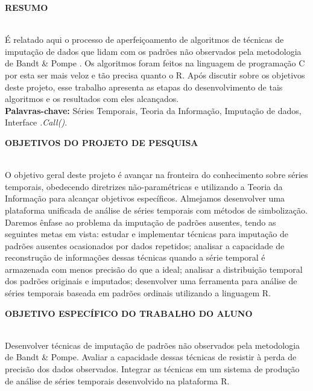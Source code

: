 \documentclass{article}
\begin{document}
\newpage
\begin{center}
\textbf{\large{RESUMO}}\\
\hrulefill\\
\end{center}

É relatado aqui o processo de aperfeiçoamento de algoritmos de técnicas de imputação de dados que lidam com os padrões não observados pela metodologia de Bandt \& Pompe \cite{bandt2002permutation}. Os algoritmos foram feitos na linguagem de programação C por esta ser mais veloz e tão precisa quanto o R. Após discutir sobre os objetivos deste projeto, esse trabalho apresenta as etapas do desenvolvimento de tais algoritmos e os resultados com eles alcançados.\\

\textbf{Palavras-chave:} Séries Temporais, Teoria da Informação, Imputação de dados, Interface \textit{.Call()}.
 
\newpage
\begin{center}
\textbf{\large{OBJETIVOS DO PROJETO DE PESQUISA}}\\
\hrulefill \\
\end{center}
          
O objetivo geral deste projeto é avançar na fronteira do conhecimento sobre séries temporais, obedecendo diretrizes não-paramétricas e utilizando a Teoria da Informação para alcançar objetivos específicos.
Almejamos desenvolver uma plataforma unificada de análise de séries temporais com métodos de simbolização. Daremos ênfase ao problema da imputação de padrões ausentes, tendo as seguintes metas em vista: estudar e implementar técnicas para imputação de padrões ausentes ocasionados por dados repetidos; analisar a capacidade de reconstrução de informações dessas técnicas quando a série temporal é armazenada com menos precisão do que a ideal; analisar a distribuição temporal dos padrões originais e imputados; desenvolver uma ferramenta para análise de séries temporais baseada em padrões ordinais utilizando a linguagem R.
    
\newpage
\begin{center}
\textbf{\large{OBJETIVO ESPECÍFICO DO TRABALHO DO ALUNO}}\\
\hrulefill \\
\end{center}
    
Desenvolver técnicas de imputação de padrões não observados pela metodologia de Bandt \& Pompe. Avaliar a capacidade dessas técnicas de resistir à perda de precisão dos dados observados. Integrar as técnicas em um sistema de produção de análise de séries temporais desenvolvido na plataforma R.
    
\end{document}
